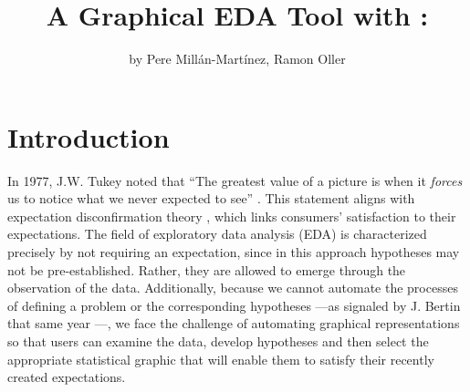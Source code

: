 \title{A Graphical EDA Tool with : }
\author{by Pere Millán-Martínez, Ramon Oller}

\maketitle


\hypertarget{introduction}{%
	\section{Introduction}\label{introduction}}

In 1977, J.W. Tukey noted that ``The greatest value of a picture is when
it \emph{forces} us to notice what we never expected to see''
\citep[p.iv]{Tukey1977}. This statement aligns with expectation
disconfirmation theory \citep{Oliver1977}, which links consumers'
satisfaction to their expectations. The field of exploratory data
analysis (EDA) is characterized precisely by not requiring an
expectation, since in this approach hypotheses may not be
pre-established. Rather, they are allowed to emerge through the
observation of the data. Additionally, because we cannot automate the
processes of defining a problem or the corresponding hypotheses ---as
signaled by J. Bertin that same year \citep[p.2]{Bertin1977}---, we face
the challenge of automating graphical representations so that users can
examine the data, develop hypotheses and then select the appropriate
statistical graphic that will enable them to satisfy their recently
created expectations.

